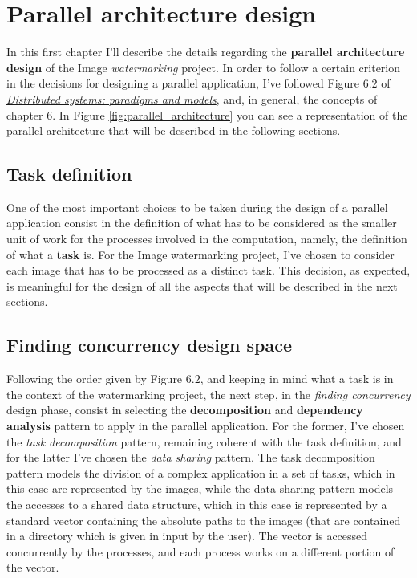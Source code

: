 \chapter{Parallel architecture design} %
\label{cha:parallel_architecture_design}
    In this first chapter I'll describe the details regarding the \textbf{parallel architecture design} of
    the Image \textit{watermarking} project. In order to follow a certain criterion in the decisions
    for designing a parallel application, I've followed Figure $6.2$ of
    \href{https://classroom.google.com/c/MTExMTY4MTg1Mzha/t/MTIyMDY0NDA0NjZa}
    {\textit{Distributed systems: paradigms and models}}, and, in general, the concepts of chapter $6$. In
    Figure \ref{fig:parallel_architecture} you can see a representation of the parallel architecture that will
    be described in the following sections.

    \section{Task definition} %
    \label{sec:task_definition}
        One of the most important choices to be taken during the design of a parallel application consist in the
        definition of what has to be considered as the smaller unit of work for the processes involved in the
        computation, namely, the definition of what a \textbf{task} is. For the Image watermarking project, I've
        chosen to consider each image that has to be processed as a distinct task. This decision, as expected, is
        meaningful for the design of all the aspects that will be described in the next sections.

    \section{Finding concurrency design space} %
    \label{sec:finding_concurrency_design_space}
        Following the order given by Figure $6.2$, and keeping in mind what a task is in the context of the
        watermarking project, the next step, in the \textit{finding concurrency} design phase, consist in
        selecting the \textbf{decomposition} and \textbf{dependency analysis} pattern to apply in the parallel
        application. For the former, I've chosen the \textit{task decomposition} pattern, remaining coherent with
        the task definition, and for the latter I've chosen the \textit{data sharing} pattern. The task
        decomposition pattern models the division of a complex application in a set of tasks, which in this case
        are represented by the images, while the data sharing pattern models the accesses to a shared data
        structure, which in this case is represented by a standard vector containing the absolute paths to the
        images (that are contained in a directory which is given in input by the user). The vector is accessed
        concurrently by the processes, and each process works on a different portion of the vector.

